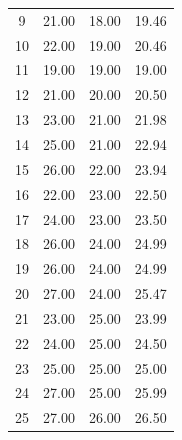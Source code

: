 {\begin{longtable}{|c|c|c|c|}
    9            & 21.00                     & 18.00                     & 19.46                      \\
    10           & 22.00                     & 19.00                     & 20.46                      \\ \hline
    11           & 19.00                     & 19.00                     & 19.00                      \\
    12           & 21.00                     & 20.00                     & 20.50                      \\
    13           & 23.00                     & 21.00                     & 21.98                      \\
    14           & 25.00                     & 21.00                     & 22.94                      \\
    15           & 26.00                     & 22.00                     & 23.94                      \\ \hline
    16           & 22.00                     & 23.00                     & 22.50                      \\
    17           & 24.00                     & 23.00                     & 23.50                      \\
    18           & 26.00                     & 24.00                     & 24.99                      \\
    19           & 26.00                     & 24.00                     & 24.99                      \\
    20           & 27.00                     & 24.00                     & 25.47                      \\ \hline
    21           & 23.00                     & 25.00                     & 23.99                      \\
    22           & 24.00                     & 25.00                     & 24.50                      \\
    23           & 25.00                     & 25.00                     & 25.00                      \\
    24           & 27.00                     & 25.00                     & 25.99                      \\
    25           & 27.00                     & 26.00                     & 26.50                      \\ \hline
\end{longtable}
\begin{longtable}{|c|c|c|c|}

\end{longtable}}
